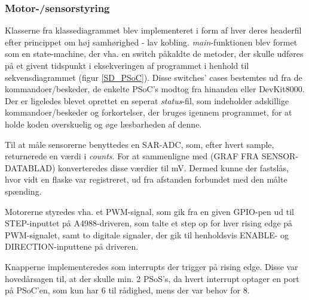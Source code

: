 \subsubsection{Motor-/sensorstyring}
Klasserne fra klassediagrammet blev implementeret i form af hver deres headerfil efter princippet om høj samhørighed - lav kobling. \textit{main}-funktionen blev formet som en state-machine, der vha. en switch påkaldte de metoder, der skulle udføres på et givent tidspunkt i eksekveringen af programmet i henhold til sekvensdiagrammet (figur \ref{SD_PSoC}). Disse switches' cases bestemtes ud fra de kommandoer/beskeder, de enkelte PSoC's modtog fra hinanden eller DevKit8000. Der er ligeledes blevet oprettet en seperat \textit{status}-fil, som indeholder adskillige kommandoer/beskeder og forkortelser, der bruges igennem programmet, for at holde koden overskuelig og øge læsbarheden af denne.

Til at måle sensorerne benyttedes en SAR-ADC, som, efter hvert sample, returnerede en værdi i \textit{counts}. For at sammenligne med (GRAF FRA SENSOR-DATABLAD) konverteredes disse værdier til mV. Dermed kunne der fastslås, hvor vidt en flaske var registreret, ud fra afstanden forbundet med den målte spænding.

Motorerne styredes vha. et PWM-signal, som gik fra en given GPIO-pen ud til STEP-inputtet på A4988-driveren, som talte et step op for hver rising edge på PWM-signalet, samt to digitale signaler, der gik til henholdsvis ENABLE- og DIRECTION-inputtene på driveren.

Knapperne implementeredes som interrupts der trigger på rising edge. Disse var hovedårsagen til, at der skulle min. 2 PSoS's, da hvert interrupt optager en port på PSoC'en, som kun har 6 til rådighed, mens der var behov for 8.